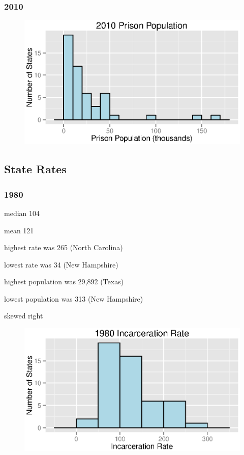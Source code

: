 \documentclass{exam}
\begin{document}
  \subsubsection{2010}
  \begin{figure}[H]
    \centering
    \includegraphics[scale = 0.9]{2010_pp_histogram.eps}
  \end{figure}

  \pagebreak

  \subsection{State Rates}

  \subsubsection{1980}
  \begin{itemize*}
    \item median 104
    \item mean 121
    \item highest rate was 265 (North Carolina)
    \item lowest rate was 34 (New Hampshire)
    \item highest population was 29,892 (Texas)
    \item lowest population was 313 (New Hampshire)
    \item skewed right
  \end{itemize*}

  \begin{figure}[H]
    \centering
    \includegraphics[scale = 0.9]{1980_rate_histogram.eps}
  \end{figure}
\end{document}
